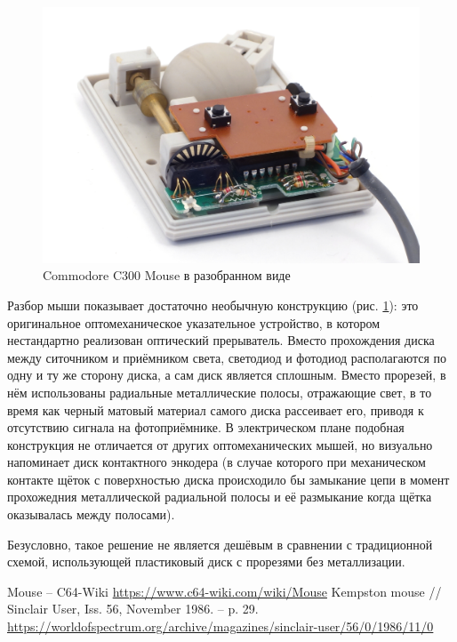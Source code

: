 \documentclass[11pt, a4paper]{article}
\begin{document}
\begin{figure}[h]
    \centering
    \includegraphics[scale=0.7]{1986_commodore_c300_mouse/cm4raz_30.jpg}
    \caption{Commodore C300 Mouse в разобранном виде}
    \label{fig:C300Inside}
\end{figure}

Разбор мыши показывает достаточно необычную конструкцию (рис. \ref{fig:C300Inside}): это оригинальное оптомеханическое указательное устройство, в котором нестандартно реализован оптический прерыватель. Вместо прохождения диска между ситочником и приёмником света, светодиод и фотодиод располагаются по одну и ту же сторону диска, а сам диск является сплошным. Вместо прорезей, в нём использованы радиальные металлические полосы, отражающие свет, в то время как черный матовый материал самого диска рассеивает его, приводя к отсутствию сигнала на фотоприёмнике. В электрическом плане подобная конструкция не отличается от других оптомеханических мышей, но визуально напоминает диск контактного энкодера (в случае которого при механическом контакте щёток с поверхностью диска происходило бы замыкание цепи в момент прохожедния металлической радиальной полосы и её размыкание когда щётка оказывалась между полосами).

Безусловно, такое решение не является дешёвым в сравнении с традиционной схемой, использующей пластиковый диск с прорезями без металлизации.

\begin{thebibliography}{9}
 Mouse -- C64-Wiki \url{https://www.c64-wiki.com/wiki/Mouse}
 Kempston mouse // Sinclair User, Iss. 56, November 1986. -- p. 29. \url{https://worldofspectrum.org/archive/magazines/sinclair-user/56/0/1986/11/0}
\end{thebibliography}
\end{document}
